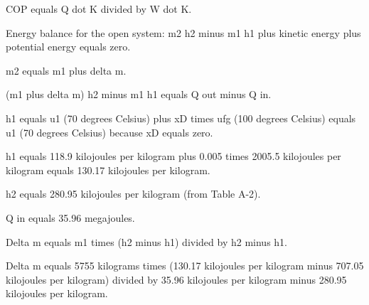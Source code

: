 COP equals Q dot K divided by W dot K.

Energy balance for the open system:  
m2 h2 minus m1 h1 plus kinetic energy plus potential energy equals zero.  

m2 equals m1 plus delta m.  

(m1 plus delta m) h2 minus m1 h1 equals Q out minus Q in.  

h1 equals u1 (70 degrees Celsius) plus xD times ufg (100 degrees Celsius) equals u1 (70 degrees Celsius) because xD equals zero.  

h1 equals 118.9 kilojoules per kilogram plus 0.005 times 2005.5 kilojoules per kilogram equals 130.17 kilojoules per kilogram.  

h2 equals 280.95 kilojoules per kilogram (from Table A-2).  

Q in equals 35.96 megajoules.  

Delta m equals m1 times (h2 minus h1) divided by h2 minus h1.  

Delta m equals 5755 kilograms times (130.17 kilojoules per kilogram minus 707.05 kilojoules per kilogram) divided by 35.96 kilojoules per kilogram minus 280.95 kilojoules per kilogram.